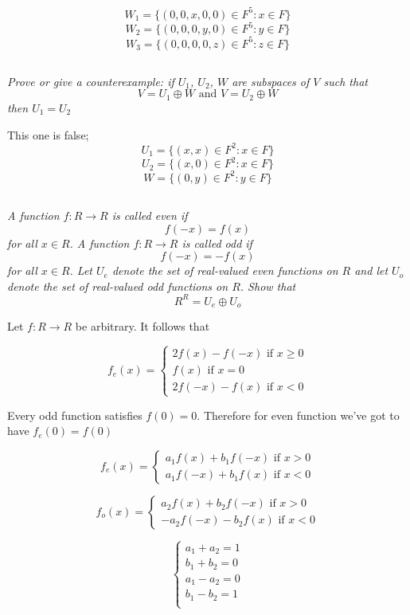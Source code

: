 \documentclass[11pt,oneside,titlepage]{book}
\begin{document}
$$W_1 = \{(0, 0, x, 0, 0) \in F^5: x \in F\}$$
$$W_2 = \{(0, 0, 0, y, 0) \in F^5: y \in F\}$$
$$W_3 = \{(0, 0, 0, 0, z) \in F^5: z \in F\}$$

\subsection{}

\textit{Prove or give a counterexample: if $U_1$, $U_2$, $W$ are subspaces
  of $V$ such that }
$$ V = U_1 \oplus W \text{ and } V = U_2 \oplus W $$
\textit{then $U_1 = U_2$}

This one is false;
$$U_1 = \{(x, x) \in F^2: x \in F\}$$
$$U_2 = \{(x, 0) \in F^2: x \in F\}$$
$$W = \{(0, y) \in F^2: y \in F\}$$

\subsection{}

\textit{A function $f: R \to R$ is called even if }
$$f(-x) = f(x)$$
\textit{for all $x \in R$. A function $f: R \to R$ is called odd if }
$$f(-x) = -f(x)$$
\textit{for all $x \in R$. Let $U_e$ denote the set of real-valued
  even functions on $R$ and let $U_o$ denote the set of real-valued odd
  functions on $R$. Show that }
$$R^R = U_e \oplus U_o$$



Let $f: R \to R$ be arbitrary. It follows that

$$f_e(x) =
\begin{cases}
  2 f(x) - f(-x) \text{ if } x \geq 0 \\
  f(x) \text{ if } x = 0 \\
  2 f(-x) - f(x) \text{ if } x < 0
\end{cases}
$$

Every odd function satisfies $f(0) = 0$.
Therefore for even function we've got to have $f_e(0) = f(0)$


$$
f_e(x) =
\begin{cases}
  a_1 f(x) + b_1 f(-x) \text{ if } x > 0 \\
  a_1 f(-x) + b_1 f(x) \text{ if } x < 0
\end{cases}
$$

$$
f_o(x) =
\begin{cases}
  a_2 f(x) + b_2 f(-x) \text{ if } x > 0 \\
  -a_2 f(-x) - b_2 f(x)  \text{ if } x < 0
\end{cases}
$$

$$
\begin{cases}
  a_1 + a_2 = 1 \\
  b_1 + b_2 = 0 \\
  a_1 - a_2 = 0 \\
  b_1 - b_2 = 1 \\
\end{cases}
$$
\end{document}
